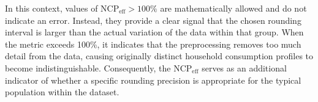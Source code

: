  

In this context, values of $\text{NCP}_{\text{eff}} >100\%$ are mathematically allowed and do not indicate an error. Instead, they provide a clear signal that the chosen rounding interval is larger than the actual variation of the data within that group. When the metric exceeds 100\%, it indicates that the preprocessing removes too much detail from the data, causing originally distinct household consumption profiles to become indistinguishable. Consequently, the $\text{NCP}_{\text{eff}}$ serves as an additional indicator of whether a specific rounding precision is appropriate for the typical population within the dataset.
